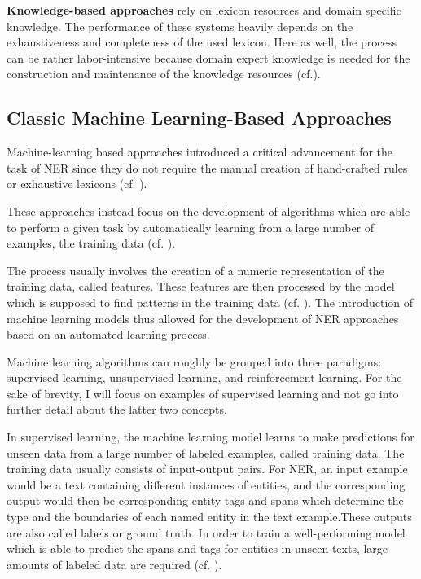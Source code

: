 \textbf{Knowledge-based approaches} rely on lexicon resources and domain specific knowledge. The performance of these systems heavily depends on the exhaustiveness and completeness of the used lexicon. Here as well, the process can be rather labor-intensive because domain expert knowledge is needed for the construction and maintenance of the knowledge resources (cf.\cite{yadav_survey_2019}). 


\subsection{Classic Machine Learning-Based Approaches}

Machine-learning based approaches introduced a critical advancement for the task of NER since they do not require the manual creation of hand-crafted rules or exhaustive lexicons (cf. \cite{nadeau_survey_2007}).

These approaches instead focus on the development of algorithms which are able to perform a given task by automatically learning from a large number of examples, the training data (cf. \cite[14]{vajjala_practical_2020}). 

The process usually involves the creation of a numeric representation of the training data, called features. These features are then processed by the model which is supposed to find patterns in the training data (cf. \cite[15]{vajjala_practical_2020}). The introduction of machine learning models thus allowed for the development of NER approaches based on an automated learning process. 

Machine learning algorithms can roughly be grouped into three paradigms: supervised learning, unsupervised learning, and reinforcement learning. For the sake of brevity, I will focus on examples of supervised learning and not go into further detail about the latter two concepts. 

In supervised learning, the machine learning model learns to make predictions for unseen data from a large number of labeled examples, called training data.  
The training data usually consists of input-output pairs. For NER, an input example would be a text containing different instances of entities, and the corresponding output would then be corresponding entity tags and spans which determine the type and the boundaries of each named entity in the text example.These outputs are also called labels or ground truth. 
In order to train a well-performing model which is able to predict the spans and tags for entities in unseen texts, large amounts of labeled data are required (cf. \cite[15]{vajjala_practical_2020}). 

